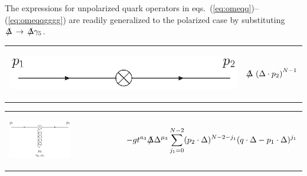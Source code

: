 \documentclass[12pt]{article}
\def\Slash#1{\rlap{\hbox{$\mskip 3 mu /$}}#1}      %
\begin{document}
The expressions for unpolarized quark operators in 
eqs.~(\ref{eq:omeqq})--(\ref{eq:omeqqgggg})
are readily generalized to the polarized case by substituting 
$\Slash{\Delta}\,\to\, \Slash{\Delta}\gamma_5$.

\begin{tabular}[h]{ll}
%
\hspace*{-10mm}
\begin{minipage}{3cm}
\vspace*{5mm}
\begin{flushleft}
  \includegraphics[width=2.25\textwidth, angle=0]{OMEqq}
\end{flushleft}
\end{minipage}
&
\begin{minipage}{13.0cm}
  \begin{eqnarray}
    \label{eq:omeqq}
    \Slash{\Delta}\, \left(\Delta \cdot p_2 \right)^{N-1}
  \end{eqnarray}
\end{minipage}
%  
\end{tabular}

\begin{tabular}[h]{ll}
%
\hspace*{-10mm}
\begin{minipage}{3cm}
\vspace*{5mm}
\begin{flushleft}
  \includegraphics[width=2.25\textwidth, angle=0]{OMEqqg}
\end{flushleft}
\end{minipage}
&
\begin{minipage}{13.0cm}
  \begin{eqnarray}
    \hspace*{20mm}
    \label{eq:omeqqg}
    - g t^{a_3} 
    \Slash{\Delta} \Delta^{\mu_3} 
    \sum\limits_{j_1=0}^{N-2} 
    (p_2\cdot \Delta)^{N-2-j_1} (q\cdot \Delta-p_1\cdot \Delta)^{j_1}
  \end{eqnarray}
\end{minipage}
% 
\end{tabular}
\vspace{10mm}
\end{document}
